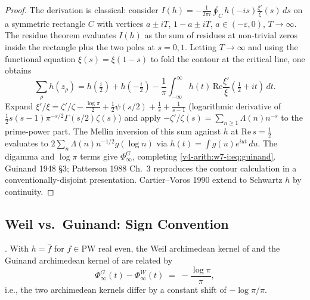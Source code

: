 \begin{proof}
The derivation is classical: consider
\(I(h)=-\frac{1}{2\pi i}\oint_{C}h(-is)\frac{\xi'}{\xi}(s)\,ds\) on a
symmetric rectangle \(C\) with vertices \(a\pm iT\), \(1-a\pm iT\),
\(a\in(-\varepsilon,0)\), \(T\to\infty\). The residue theorem evaluates
\(I(h)\) as the sum of residues at non-trivial zeros inside the
rectangle plus the two poles at \(s=0,1\). Letting \(T\to\infty\) and
using the functional equation \(\xi(s)=\xi(1-s)\) to fold the contour
at the critical line, one obtains
\[
\sum_{\rho}h(z_{\rho})
=h(\tfrac{i}{2})+h(-\tfrac{i}{2})
-\frac{1}{\pi}\int_{-\infty}^{\infty}h(t)\,\mathrm{Re}\frac{\xi'}{\xi}(\tfrac12+it)\,dt.
\]
Expand \(\xi'/\xi=\zeta'/\zeta-\tfrac{\log\pi}{2}+\tfrac{1}{2}\psi(s/2)+\tfrac{1}{s}+\tfrac{1}{s-1}\)
(logarithmic derivative of \(\tfrac{1}{2}s(s-1)\pi^{-s/2}\Gamma(s/2)\zeta(s)\))
and apply \(-\zeta'/\zeta(s)=\sum_{n\geq 1}\Lambda(n)n^{-s}\) to the
prime-power part. The Mellin inversion of this sum against \(h\) at
\(\mathrm{Re}\,s=\tfrac12\) evaluates to \(2\sum_{n}\Lambda(n)n^{-1/2}g(\log n)\)
via \(h(t)=\int g(u)e^{iut}\,du\). The digamma and \(\log\pi\) terms
give \(\Phi_{\infty}^{G}\), completing
\eqref{v4-arith:w7-i:eq:guinand}.
Guinand 1948 \S3; Patterson 1988 Ch.~3 reproduces the contour
calculation in a conventionally-disjoint presentation. Cartier--Voros
1990 extend to Schwartz \(h\) by continuity.
\end{proof}

\subsection{Weil vs.~Guinand: Sign Convention}
\label{v4-arith:w7-i:guinand:sign-convention}

\begin{proposition}
\label{v4-arith:w7-i:prop:weil-vs-guinand}
\ClaimStatusProvedHere. With \(h=\widehat{f}\) for \(f\in\mathrm{PW}\)
real even, the Weil archimedean kernel of
 and the Guinand archimedean
kernel of  are related by
\begin{equation}
\label{v4-arith:w7-i:eq:weil-guinand-dictionary}
\Phi_{\infty}^{G}(t)-\Phi_{\infty}^{W}(t)\;=\;-\frac{\log\pi}{\pi},
\end{equation}
i.e., the two archimedean kernels differ by a constant shift of
\(-\log\pi/\pi\).
\end{proposition}

